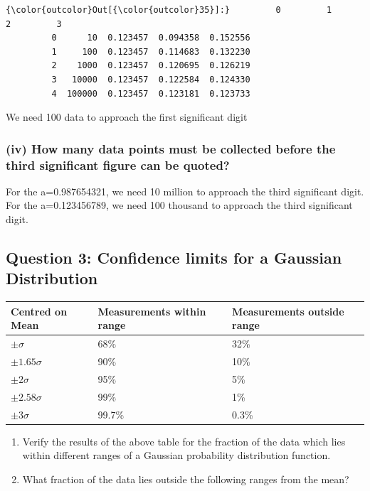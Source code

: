\documentclass[11pt]{article}
\providecommand{\tightlist}{%
      \setlength{\itemsep}{0pt}\setlength{\parskip}{0pt}}
\begin{document}
\begin{Verbatim}[commandchars=\\\{\}]
{\color{outcolor}Out[{\color{outcolor}35}]:}         0         1         2         3
         0      10  0.123457  0.094358  0.152556
         1     100  0.123457  0.114683  0.132230
         2    1000  0.123457  0.120695  0.126219
         3   10000  0.123457  0.122584  0.124330
         4  100000  0.123457  0.123181  0.123733
\end{Verbatim}
            
    We need 100 data to approach the first significant digit

    \hypertarget{iv-how-many-data-points-must-be-collected-before-the-third-significant-figure-can-be-quoted}{%
\subsubsection{(iv) How many data points must be collected before the
third significant figure can be
quoted?}\label{iv-how-many-data-points-must-be-collected-before-the-third-significant-figure-can-be-quoted}}

    For the a=0.987654321, we need 10 million to approach the third
significant digit. For the a=0.123456789, we need 100 thousand to
approach the third significant digit.

    \hypertarget{question-3-confidence-limits-for-a-gaussian-distribution}{%
\subsection{Question 3: Confidence limits for a Gaussian
Distribution}\label{question-3-confidence-limits-for-a-gaussian-distribution}}

\begin{longtable}[]{@{}lll@{}}
\toprule
Centred on Mean & Measurements within range & Measurements outside
range\tabularnewline
\midrule
\endhead
\(\pm\sigma\) & 68\% & 32\%\tabularnewline
\(\pm1.65\sigma\) & 90\% & 10\%\tabularnewline
\(\pm2\sigma\) & 95\% & 5\%\tabularnewline
\(\pm2.58\sigma\) & 99\% & 1\%\tabularnewline
\(\pm3\sigma\) & 99.7\% & 0.3\%\tabularnewline
\bottomrule
\end{longtable}

\begin{enumerate}
\def\labelenumi{(\roman{enumi})}
\tightlist
\item
  Verify the results of the above table for the fraction of the data
  which lies within different ranges of a Gaussian probability
  distribution function. 
\item
  What fraction of the data lies outside the following ranges from the
  mean?
\end{enumerate}
\end{document}
